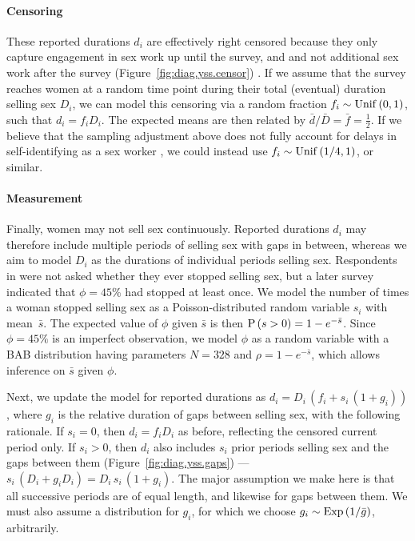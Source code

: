 \paragraph{Censoring}
These reported durations $d_i$ are effectively right censored
because they only capture engagement in sex work up until the survey, and
and not additional sex work after the survey
(Figure~\ref{fig:diag.yss.censor}) \cite{Fazito2012}.
If we assume that the survey reaches women at a random time point
during their total (eventual) duration selling sex $D_i$, we can model this censoring via
a random fraction $f_i \sim \mathrm{Unif}\,(0,1)$, such that $d_i = f_i D_i$.
The expected means are then related by $\bar{d} / \bar{D} = \bar{f} = \frac12$.
If we believe that the sampling adjustment above does not fully account for
delays in self-identifying as a sex worker \cite{Cheuk2020},
we could instead use $f_i \sim \mathrm{Unif}\,(1/4,1)$, or similar.
\paragraph{Measurement}
Finally, women may not sell sex continuously.
Reported durations $d_i$ may therefore include
multiple periods of selling sex with gaps in between,
whereas we aim to model $D_i$ as the durations of individual periods selling sex.
Respondents in \cite{Baral2014} were not asked whether they ever stopped selling sex,
but a later survey \cite{EswKP2014} indicated that $\phi = 45\%$ had stopped at least once.
We model the number of times a woman stopped selling sex as
a Poisson-distributed random variable $s_i$ with mean~$\bar{s}$.
The expected value of $\phi$ given $\bar{s}$ is then $\mathrm{P}\,(s > 0) = 1 - e^{-\bar{s}}$.
Since $\phi = 45\%$ is an imperfect observation,
we model $\phi$ as a random variable with a BAB distribution
having parameters $N = 328$ and $\rho = 1 - e^{-\bar{s}}$,
which allows inference on $\bar{s}$ given $\phi$.
\par
Next, we update the model for reported durations as $d_i = D_i\,(f_i + s_i\,(1 + g_i))$,
where $g_i$ is the relative duration of gaps between selling sex,
with the following rationale.
If $s_i = 0$, then $d_i = f_i D_i$ as before, reflecting the censored current period only.
If $s_i > 0$, then $d_i$ also includes $s_i$ prior periods selling sex and the gaps between them
(Figure~\ref{fig:diag.yss.gaps}) --- \ie $s_i\,(D_i + g_i D_i) = D_i\,s_i\,(1 + g_i)$.
The major assumption we make here is that
all successive periods are of equal length, and likewise for gaps between them.
We must also assume a distribution for $g_i$, for which we choose
$g_i \sim \mathrm{Exp}\,(1/\bar{g})$, arbitrarily.
